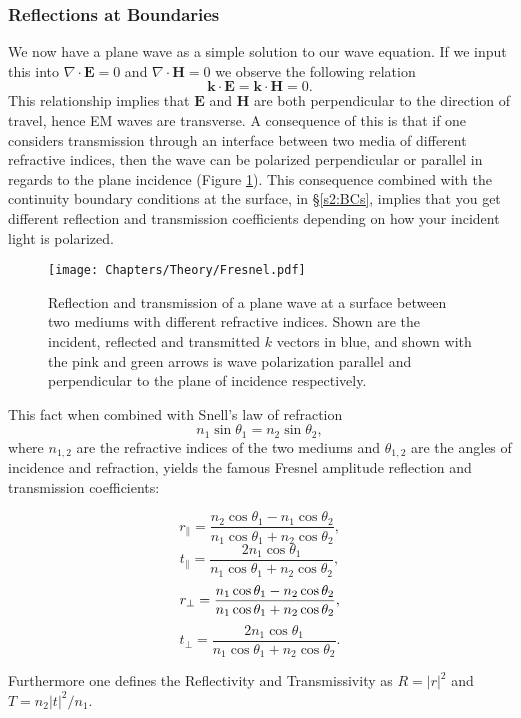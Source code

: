\subsubsection{Reflections at Boundaries}\label{sec:fresnel}
We now have a plane wave as a simple solution to our wave equation. If we input this into $\nabla \cdot \mathbf{E}=0$ and $\nabla \cdot \mathbf{H} =0$ we observe the following relation
\begin{equation}
\mathbf{k} \cdot \mathbf{E}=\mathbf{k} \cdot \mathbf{H}=0.
\label{eq:k transverse}
\end{equation}
This relationship implies that $\mathbf{E}$ and $\mathbf{H}$ are both perpendicular to the direction of travel, hence EM waves are transverse. A consequence of this is that if one considers transmission through an interface between two media of different refractive indices, then the wave can be polarized perpendicular or parallel in regards to the plane incidence (Figure \ref{fig:Fresnel}). This consequence combined with the continuity boundary conditions at the surface, in \S \ref{s2:BCs}, implies that you get different reflection and transmission coefficients depending on how your incident light is polarized.
\begin{figure}[h]\centering
\texttt{[image: Chapters/Theory/Fresnel.pdf]}
\caption{Reflection and transmission of a plane wave at a surface between two mediums with different refractive indices. Shown are the incident, reflected and transmitted $k$ vectors in blue, and shown with the pink and green arrows is wave polarization parallel and perpendicular to the plane of incidence respectively.}
\label{fig:Fresnel}
\end{figure}
This fact when combined with Snell's law of refraction
\begin{equation}
n_1 \sin \theta_1=n_2 \sin \theta_2,
\label{eq:Snell's law}
\end{equation}
where $n_{1,2}$ are the refractive indices of the two mediums and $\theta_{1,2}$ are the angles of incidence and refraction, yields the famous Fresnel amplitude reflection and transmission coefficients:
\begin{multicols}{2}
\noindent    %
\begin{equation}
r_{\parallel}=\frac{n_2 \cos \theta_1 - n_1 \cos \theta_2}{n_1 \cos \theta_1 + n_2 \cos \theta_2},  \end{equation}
\begin{equation}
t_{\parallel}=\frac{2n_1 \cos \theta_1}{n_1 \cos \theta_1 + n_2 \cos \theta_2},
\label{eq:Fresnel para}
\end{equation}
\begin{equation}\break
r_{\perp}=\frac{n_1 \cos \theta_1 - n_2 \cos \theta_2}{n_1 \cos \theta_1 + n_2 \cos \theta_2},
\end{equation}
\begin{equation}
t_{\perp}=\frac{2n_1 \cos \theta_1}{n_1 \cos \theta_1 + n_2 \cos \theta_2}.
\label{eq:Fresnel perp}
\end{equation}
\end{multicols} \noindent 
Furthermore one defines the Reflectivity and Transmissivity as $R=|r|^{2}$ and $T=n_2 |t|^2/n_1$.


